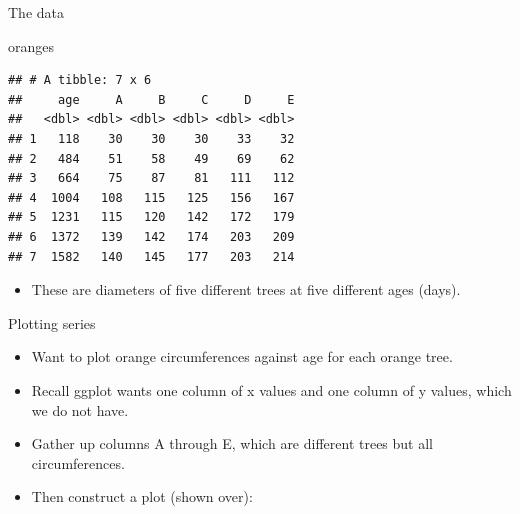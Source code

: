 \documentclass[ignorenonframetext,]{beamer}
\newenvironment{Shaded}{\begin{snugshade}}{\end{snugshade}}
\newcommand{\DataTypeTok}[1]{\textcolor[rgb]{0.13,0.29,0.53}{#1}}
\newcommand{\KeywordTok}[1]{\textcolor[rgb]{0.13,0.29,0.53}{\textbf{#1}}}
\newcommand{\NormalTok}[1]{#1}
\newcommand{\OperatorTok}[1]{\textcolor[rgb]{0.81,0.36,0.00}{\textbf{#1}}}
\newcommand{\StringTok}[1]{\textcolor[rgb]{0.31,0.60,0.02}{#1}}
\providecommand{\tightlist}{%
  \setlength{\itemsep}{0pt}\setlength{\parskip}{0pt}}
\begin{document}
\begin{frame}[fragile]{The data}
\protect\hypertarget{the-data-5}{}

\begin{Shaded}
\begin{Highlighting}[]
\NormalTok{oranges}
\end{Highlighting}
\end{Shaded}

\begin{verbatim}
## # A tibble: 7 x 6
##     age     A     B     C     D     E
##   <dbl> <dbl> <dbl> <dbl> <dbl> <dbl>
## 1   118    30    30    30    33    32
## 2   484    51    58    49    69    62
## 3   664    75    87    81   111   112
## 4  1004   108   115   125   156   167
## 5  1231   115   120   142   172   179
## 6  1372   139   142   174   203   209
## 7  1582   140   145   177   203   214
\end{verbatim}

\begin{itemize}
\tightlist
\item
  These are diameters of five different trees at five different ages
  (days).
\end{itemize}

\end{frame}

\begin{frame}[fragile]{Plotting series}
\protect\hypertarget{plotting-series}{}

\begin{itemize}
\item
  Want to plot orange circumferences against age for each orange tree.
\item
  Recall ggplot wants one column of x values and one column of y values,
  which we do not have.
\item
  Gather up columns A through E, which are different trees but all
  circumferences.
\item
  Then construct a plot (shown over):
\end{itemize}

\begin{Shaded}
\end{Shaded}

\end{frame}
\end{document}
